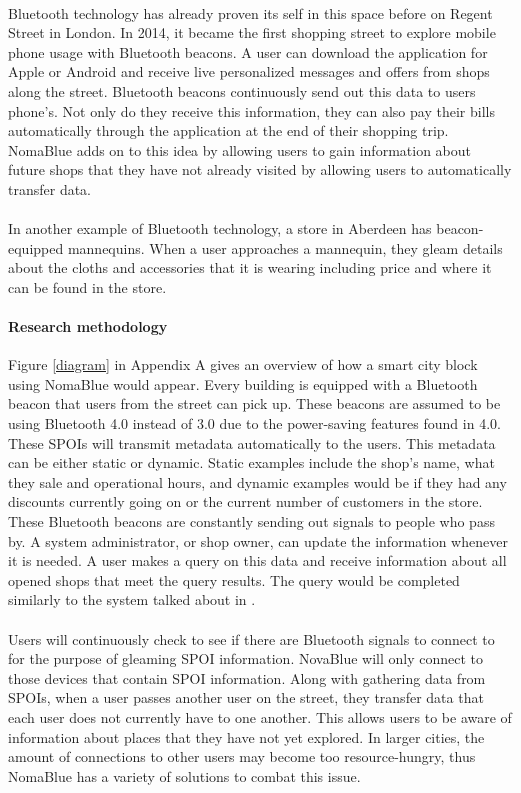 \documentclass[a4paper,12pt]{article}
\begin{document}
\paragraph{}
Bluetooth technology has already proven its self in this space before on Regent Street in London. In 2014, it became the first shopping street to explore mobile phone usage with Bluetooth beacons. A user can download the application for Apple or Android and receive live personalized messages and offers from shops along the street. Bluetooth beacons continuously send out this data to users phone's. Not only do they receive this information, they can also pay their bills automatically through the application at the end of their shopping trip. NomaBlue adds on to this idea by allowing users to gain information about future shops that they have not already visited by allowing users to automatically transfer data.
\paragraph{}
In another example of Bluetooth technology, a store in Aberdeen has beacon-equipped mannequins. When a user approaches a mannequin, they gleam details about the cloths and accessories that it is wearing including price and where it can be found in the store.
\paragraph{Research methodology}
Figure \ref{diagram} in Appendix A gives an overview of how a smart city block using NomaBlue would appear. Every building is equipped with a Bluetooth beacon that users from the street can pick up. These beacons are assumed to be using Bluetooth 4.0 instead of 3.0 due to the power-saving features found in 4.0. These SPOIs will transmit metadata automatically to the users. This metadata can be either static or dynamic. Static examples include the shop's name, what they sale and operational hours, and dynamic examples would be if they had any discounts currently going on or the current number of customers in the store. These Bluetooth beacons are constantly sending out signals to people who pass by. A system administrator, or shop owner, can update the information whenever it is needed. A user makes a query on this data and receive information about all opened shops that meet the query results. The query would be completed similarly to the system talked about in \cite{openstreetmap}.
\paragraph{}
Users will continuously check to see if there are Bluetooth signals to connect to for the purpose of gleaming SPOI information. NovaBlue will only connect to those devices that contain SPOI information. Along with gathering data from SPOIs, when a user passes another user on the street, they transfer data that each user does not currently have to one another. This allows users to be aware of information about places that they have not yet explored. In larger cities, the amount of connections to other users may become too resource-hungry, thus NomaBlue has a variety of solutions to combat this issue.
\end{document}
